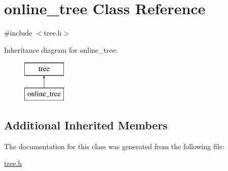 \hypertarget{classonline__tree}{\section{online\+\_\+tree Class Reference}
\label{classonline__tree}
}


{\ttfamily \#include $<$tree.\+h$>$}

Inheritance diagram for online\+\_\+tree\+:\begin{figure}[H]
\begin{center}
\leavevmode
\includegraphics[height=2.000000cm]{classonline__tree}
\end{center}
\end{figure}
\subsection*{Additional Inherited Members}


The documentation for this class was generated from the following file\+:\begin{DoxyCompactItemize}
\item 
\hyperlink{tree_8h}{tree.\+h}\end{DoxyCompactItemize}
